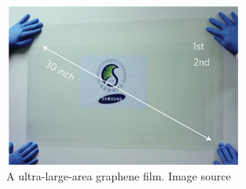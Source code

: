 \begin{figure}[htbp!] 
\centering  
\includegraphics[width=0.7\textwidth]{30-inches-gr.jpg}
\caption{A ultra-large-area graphene film. Image source \cite{Bae2010}}  
\label{fig:30gr}
\end{figure} 

